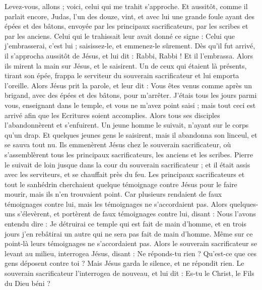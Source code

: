 \begin{multicols}{2}
Levez-vous, allons ; voici, celui qui me trahit s'approche.
Et aussitôt, comme il parlait encore, Judas, l'un des douze, vint, et avec lui une grande foule ayant des épées et des bâtons, envoyée par les principaux sacrificateurs, par les scribes et par les anciens.
Celui qui le trahissait leur avait donné ce signe : Celui que j'embrasserai, c’est lui ; saisissez-le, et emmenez-le sûrement.
Dès qu’il fut arrivé, il s'approcha aussitôt de Jésus, et lui dit : Rabbi, Rabbi ! Et il l’embrassa.
Alors ils mirent la main sur Jésus, et le saisirent.
Un de ceux qui étaient là présents, tirant son épée, frappa le serviteur du souverain sacrificateur et lui emporta l'oreille.
Alors Jésus prit la parole, et leur dit : Vous êtes venus comme après un brigand, avec des épées et des bâtons, pour m’arrêter.
J’étais tous les jours parmi vous, enseignant dans le temple, et vous ne m'avez point saisi ; mais tout ceci est arrivé afin que les Ecritures soient accomplies.
Alors tous ses disciples l'abandonnèrent et s'enfuirent.
Un jeune homme le suivait, n’ayant sur le corps qu’un drap. Et quelques jeunes gens le saisirent,
mais il abandonna son linceul, et se sauva tout nu.
Ils emmenèrent Jésus chez le souverain sacrificateur, où s'assemblèrent tous les principaux sacrificateurs, les anciens et les scribes.
Pierre le suivait de loin jusque dans la cour du souverain sacrificateur ; et il était assis avec les serviteurs, et se chauffait près du feu.
Les principaux sacrificateurs et tout le sanhédrin cherchaient quelque témoignage contre Jésus pour le faire mourir, mais ils n'en trouvaient point.
Car plusieurs rendaient de faux témoignages contre lui, mais les témoignages ne s’accordaient pas.
Alors quelques-uns s'élevèrent, et portèrent de faux témoignages contre lui, disant :
Nous l’avons entendu dire : Je détruirai ce temple qui est fait de main d’homme, et en trois jours j'en rebâtirai un autre qui ne sera pas fait de main d’homme.
Même sur ce point-là leurs témoignages ne s’accordaient pas.
Alors le souverain sacrificateur se levant au milieu, interrogea Jésus, disant : Ne réponds-tu rien ? Qu’est-ce que ces gens déposent contre toi ?
Mais Jésus garda le silence, et ne répondit rien. Le souverain sacrificateur l'interrogea de nouveau, et lui dit : Es-tu le Christ, le Fils du Dieu béni ?

\end{multicols}
